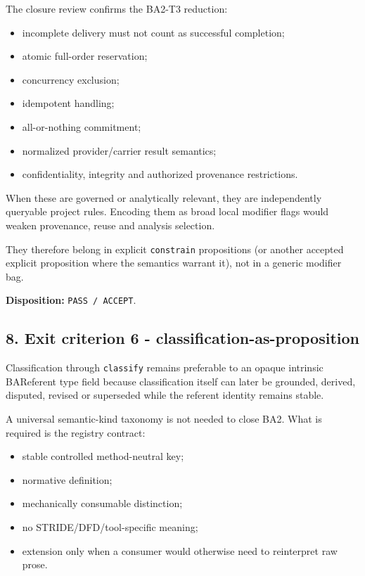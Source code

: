 \documentclass[11pt,a4paper]{article}
\providecommand{\tightlist}{\setlength{\itemsep}{0pt}\setlength{\parskip}{0pt}}
\begin{document}
The closure review confirms the BA2-T3 reduction:

\begin{itemize}
\tightlist
\item
  incomplete delivery must not count as successful completion;
\item
  atomic full-order reservation;
\item
  concurrency exclusion;
\item
  idempotent handling;
\item
  all-or-nothing commitment;
\item
  normalized provider/carrier result semantics;
\item
  confidentiality, integrity and authorized provenance restrictions.
\end{itemize}

When these are governed or analytically relevant, they are independently queryable project rules. Encoding them as broad local modifier flags would weaken provenance, reuse and analysis selection.

They therefore belong in explicit \texttt{constrain} propositions (or another accepted explicit proposition where the semantics warrant it), not in a generic modifier bag.

\textbf{Disposition:} \texttt{PASS\ /\ ACCEPT}.

\subsection{8. Exit criterion 6 - classification-as-proposition}\label{exit-criterion-6---classification-as-proposition}

Classification through \texttt{classify} remains preferable to an opaque intrinsic BAReferent type field because classification itself can later be grounded, derived, disputed, revised or superseded while the referent identity remains stable.

A universal semantic-kind taxonomy is not needed to close BA2. What is required is the registry contract:

\begin{itemize}
\tightlist
\item
  stable controlled method-neutral key;
\item
  normative definition;
\item
  mechanically consumable distinction;
\item
  no STRIDE/DFD/tool-specific meaning;
\item
  extension only when a consumer would otherwise need to reinterpret raw prose.
\end{itemize}
\end{document}
